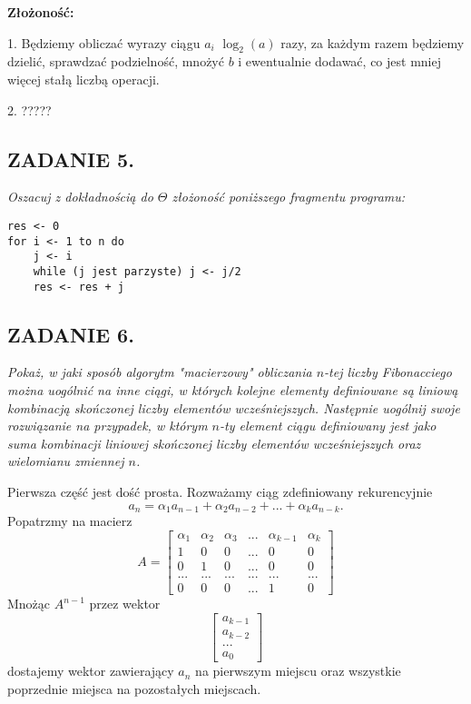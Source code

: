 \documentclass{article}
\begin{document}
\textbf{Złożoność:}

1. Będziemy obliczać wyrazy ciągu $a_i$ $\log_2(a)$ razy, za każdym razem będziemy dzielić, sprawdzać podzielność, mnożyć $b$ i ewentualnie dodawać, co jest mniej więcej stałą liczbą operacji.

2. {\color{orange}?????}

\subsection*{ZADANIE 5.}
\emph{Oszacuj z dokładnością do $\Theta$ złożoność poniższego fragmentu programu:}
\begin{lstlisting}
res <- 0
for i <- 1 to n do
    j <- i
    while (j jest parzyste) j <- j/2
    res <- res + j
\end{lstlisting}

\subsection*{ZADANIE 6.}
\emph{Pokaż, w jaki sposób algorytm "macierzowy" obliczania $n$-tej liczby Fibonacciego można uogólnić na inne ciągi, w których kolejne elementy definiowane są liniową kombinacją skończonej liczby elementów wcześniejszych. Następnie uogólnij swoje rozwiązanie na przypadek, w którym $n$-ty element ciągu definiowany jest jako suma kombinacji liniowej skończonej liczby elementów wcześniejszych oraz wielomianu zmiennej $n$.}
\medskip

Pierwsza część jest dość prosta. Rozważamy ciąg zdefiniowany rekurencyjnie
$$a_n=\alpha_1a_{n-1}+\alpha_2a_{n-2}+...+\alpha_ka_{n-k}.$$
Popatrzmy na macierz
$$A=\begin{bmatrix}
    \alpha_1 & \alpha_2 & \alpha_3 & ... &\alpha_{k-1} & \alpha_k\\
    1 & 0 & 0 & ... & 0 & 0\\
    0 & 1 & 0 & ... & 0 & 0\\
    ... & ... & ... & ... & ... & ...\\
    0 & 0 & 0 & ... & 1 & 0
\end{bmatrix}$$
Mnożąc $A^{n-1}$ przez wektor
$$\begin{bmatrix}
    a_{k-1}\\
    a_{k-2}\\
    ...\\
    a_0
\end{bmatrix}$$
dostajemy wektor zawierający $a_n$ na pierwszym miejscu oraz wszystkie poprzednie miejsca na pozostałych miejscach.
\smallskip
\end{document}
